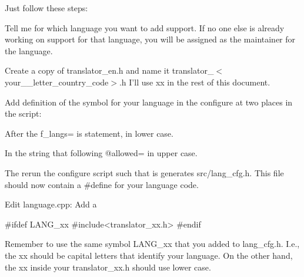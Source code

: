 Just follow these steps: 
\begin{DoxyEnumerate}
\item Tell me for which language you want to add support. If no one else is already working on support for that language, you will be assigned as the maintainer for the language. 
\item Create a copy of translator\_\-en.h and name it translator\_\-$<$your\_\_\-letter\_\-country\_\-code$>$.h I'll use xx in the rest of this document. 
\item Add definition of the symbol for your language in the configure at two places in the script: 
\begin{DoxyEnumerate}
\item After the {\ttfamily f\_\-langs=} is statement, in lower case. 
\item In the string that following {\ttfamily @allowed=} in upper case. 
\end{DoxyEnumerate}The rerun the configure script such that is generates src/lang\_\-cfg.h. This file should now contain a \#define for your language code. 
\item Edit language.cpp: Add a \begin{DoxyVerb}
#ifdef LANG_xx
#include<translator_xx.h>
#endif
\end{DoxyVerb}
 Remember to use the same symbol LANG\_\-xx that you added to {\ttfamily lang\_\-cfg.h}. I.e., the {\ttfamily xx} should be capital letters that identify your language. On the other hand, the {\ttfamily xx} inside your {\ttfamily translator\_\-xx.h} should use lower case. 


\end{DoxyEnumerate}
